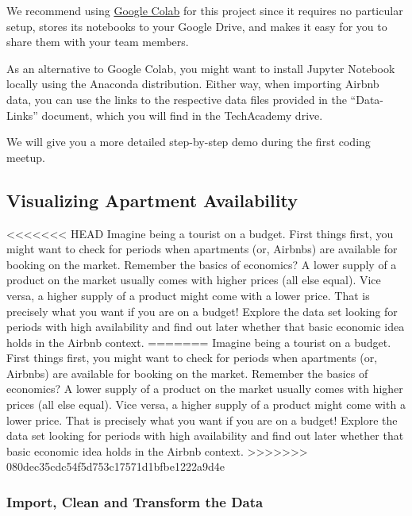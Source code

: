 \documentclass[
  11pt,
]{article}
\newenvironment{tipsp}[1]
  {
  \begin{itemize}
  \footnotesize
  \renewcommand{\labelitemi}{
    \raisebox{-.7\height}[0pt][0pt]{
      {\setkeys{Gin}{width=3em,keepaspectratio}
        \texttt{[image: images/\#1.png]}}
    }
  }
  \setlength{\fboxsep}{1em}
  \begin{pbox}
  \item
  }
  {
  \end{pbox}
  \end{itemize}
  }
\begin{document}
\begin{tipsp}p
We recommend using \href{https://colab.research.google.com}{Google Colab} for this project since it requires no particular setup, stores its notebooks to your Google Drive, and makes it easy for you to share them with your team members.

As an alternative to Google Colab, you might want to install Jupyter Notebook locally using the Anaconda distribution.
Either way, when importing Airbnb data, you can use the links to the respective data files provided in the ``Data-Links'' document, which you will find in the TechAcademy drive.

We will give you a more detailed step-by-step demo during the first coding meetup.


\end{tipsp}

\hypertarget{visualizing-apartment-availability}{%
\subsection{Visualizing Apartment Availability}\label{visualizing-apartment-availability}}

<<<<<<< HEAD
Imagine being a tourist on a budget.
First things first, you might want to check for periods when apartments (or, Airbnbs) are available for booking on the market.
Remember the basics of economics?
A lower supply of a product on the market usually comes with higher prices (all else equal).
Vice versa, a higher supply of a product might come with a lower price.
That is precisely what you want if you are on a budget!
Explore the data set looking for periods with high availability and find out later whether that basic economic idea holds in the Airbnb context.
=======
Imagine being a tourist on a budget. First things first, you might want to check for periods when apartments (or, Airbnbs) are available for booking on the market. Remember the basics of economics? A lower supply of a product on the market usually comes with higher prices (all else equal). Vice versa, a higher supply of a product might come with a lower price. That is precisely what you want if you are on a budget! Explore the data set looking for periods with high availability and find out later whether that basic economic idea holds in the Airbnb context.
>>>>>>> 080dec35cdc54f5d753c17571d1bfbe1222a9d4e

\hypertarget{import-clean-and-transform-the-data}{%
\subsubsection{Import, Clean and Transform the Data}\label{import-clean-and-transform-the-data}}
\end{document}
